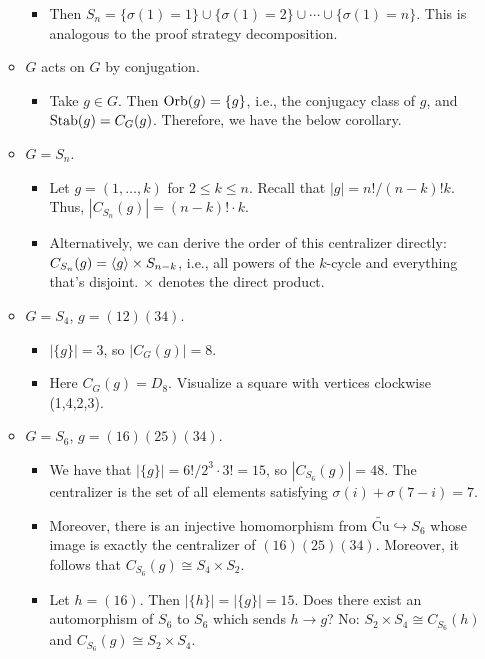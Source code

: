 \documentclass[../notes.tex]{subfiles}
\begin{document}
\begin{itemize}
\begin{itemize}
\begin{itemize}
            \item Then $S_n=\{\sigma(1)=1\}\cup\{\sigma(1)=2\}\cup\cdots\cup\{\sigma(1)=n\}$. This is analogous to the proof strategy decomposition.
        \end{itemize}
        \item $G$ acts on $G$ by conjugation.
        \begin{itemize}
            \item Take $g\in G$. Then $\operatorname{Orb}(g)=\{g\}$, i.e., the conjugacy class of $g$, and $\operatorname{Stab}(g)=C_G(g)$. Therefore, we have the below corollary.
        \end{itemize}
        \item $G=S_n$.
        \begin{itemize}
            \item Let $g=(1,\dots,k)$ for $2\leq k\leq n$. Recall that $|g|=n!/(n-k)!k$. Thus, $|C_{S_n}(g)|=(n-k)!\cdot k$.
            \item Alternatively, we can derive the order of this centralizer directly: $C_{S_n}(g)=\left\langle{g}\right\rangle\times S_{n-k}$, i.e., all powers of the $k$-cycle and everything that's disjoint. $\times$ denotes the direct product.
        \end{itemize}
        \item $G=S_4$, $g=(12)(34)$.
        \begin{itemize}
            \item $|\{g\}|=3$, so $|C_G(g)|=8$.
            \item Here $C_G(g)=D_8$. Visualize a square with vertices clockwise (1,4,2,3).
        \end{itemize}
        \item $G=S_6$, $g=(16)(25)(34)$.
        \begin{itemize}
            \item We have that $|\{g\}|=6!/2^3\cdot 3!=15$, so $|C_{S_6}(g)|=48$. The centralizer is the set of all elements satisfying $\sigma(i)+\sigma(7-i)=7$.
            \item Moreover, there is an injective homomorphism from $\widetilde{\text{Cu}}\hookrightarrow S_6$ whose image is exactly the centralizer of $(16)(25)(34)$. Moreover, it follows that $C_{S_6}(g)\cong S_4\times S_2$.
            \item Let $h=(16)$. Then $|\{h\}|=|\{g\}|=15$. Does there exist an automorphism of $S_6$ to $S_6$ which sends $h\to g$? No: $S_2\times S_4\cong C_{S_6}(h)$ and $C_{S_6}(g)\cong S_2\times S_4$.
        \end{itemize}

\end{itemize}
\end{itemize}
\end{document}
